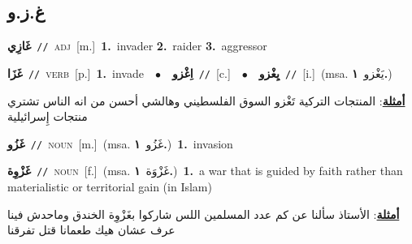 \documentclass[10pt,a4paper,twoside]{article} %
\begin{document}
\begin{multicols}{2}
\vspace{-3mm}
\subsection*{\color{blue}\foreignlanguage{arabic}{غ.ز.و}\color{blue}{}} 

{\setlength\topsep{0pt}\textbf{\foreignlanguage{arabic}{غَازِي}}\ {\color{gray}\texttt{//}\color{black}}\ \textsc{adj}\ [m.]\ \textbf{1.}~invader  \textbf{2.}~raider  \textbf{3.}~aggressor\ } \vspace{2mm}

{\setlength\topsep{0pt}\textbf{\foreignlanguage{arabic}{غَزَا}}\ {\color{gray}\texttt{//}\color{black}}\ \textsc{verb}\ [p.]\ \textbf{1.}~invade\ \ $\bullet$\ \ \setlength\topsep{0pt}\textbf{\foreignlanguage{arabic}{اِغْزو}}\ {\color{gray}\texttt{//}\color{black}}\ [c.]\ \ $\bullet$\ \ \setlength\topsep{0pt}\textbf{\foreignlanguage{arabic}{يِغْزو}}\ {\color{gray}\texttt{//}\color{black}}\ [i.]\ \color{gray}(msa. \foreignlanguage{arabic}{يَغْزو}~\foreignlanguage{arabic}{\textbf{١.}})\color{black}\  \begin{flushright}\color{gray}\foreignlanguage{arabic}{\textbf{\underline{\foreignlanguage{arabic}{أمثلة}}}: المنتجات التركية تَغْزو السوق الفلسطيني وهالشي أحسن من انه الناس تشتري منتجات إِسرائيلية}\end{flushright}\color{black}} \vspace{2mm}

{\setlength\topsep{0pt}\textbf{\foreignlanguage{arabic}{غَزُو}}\ {\color{gray}\texttt{//}\color{black}}\ \textsc{noun}\ [m.]\ \color{gray}(msa. \foreignlanguage{arabic}{غَزُو}~\foreignlanguage{arabic}{\textbf{١.}})\color{black}\ \textbf{1.}~invasion\ } \vspace{2mm}

{\setlength\topsep{0pt}\textbf{\foreignlanguage{arabic}{غَزْوِة}}\ {\color{gray}\texttt{//}\color{black}}\ \textsc{noun}\ [f.]\ \color{gray}(msa. \foreignlanguage{arabic}{غَزْوَة}~\foreignlanguage{arabic}{\textbf{١.}})\color{black}\ \textbf{1.}~a war that is guided by faith rather than materialistic or territorial gain (in Islam)\  \begin{flushright}\color{gray}\foreignlanguage{arabic}{\textbf{\underline{\foreignlanguage{arabic}{أمثلة}}}: الأستاذ سألنا عن كم عدد المسلمين اللس شاركوا بغَزْوِة الخندق وماحدش فينا عرف عشان هيك طعمانا قتل تفرقنا}\end{flushright}\color{black}} \vspace{2mm}


\end{multicols}
\end{document}
